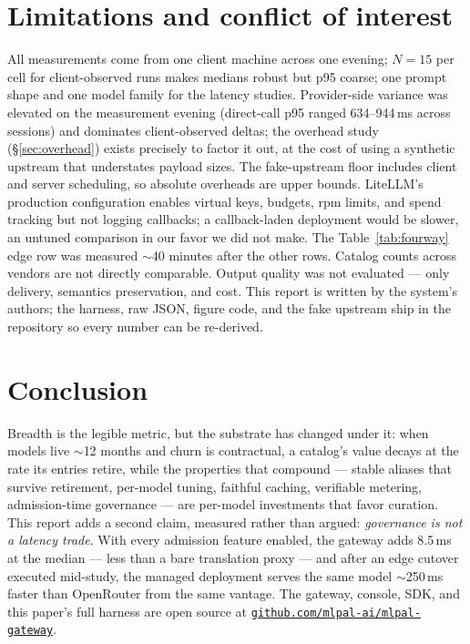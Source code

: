 \documentclass[10pt]{article}
\begin{document}
\section{Limitations and conflict of interest}\label{sec:limits}
All measurements come from one client machine across one evening; $N{=}15$ per cell for client-observed runs makes medians robust but p95 coarse; one prompt shape and one model family for the latency studies. Provider-side variance was elevated on the measurement evening (direct-call p95 ranged 634--944\,ms across sessions) and dominates client-observed deltas; the overhead study (\S\ref{sec:overhead}) exists precisely to factor it out, at the cost of using a synthetic upstream that understates payload sizes. The fake-upstream floor includes client and server scheduling, so absolute overheads are upper bounds. LiteLLM's production configuration enables virtual keys, budgets, rpm limits, and spend tracking but not logging callbacks; a callback-laden deployment would be slower, an untuned comparison in our favor we did not make. The Table~\ref{tab:fourway} edge row was measured $\sim$40 minutes after the other rows. Catalog counts across vendors are not directly comparable. Output quality was not evaluated --- only delivery, semantics preservation, and cost. This report is written by the system's authors; the harness, raw JSON, figure code, and the fake upstream ship in the repository so every number can be re-derived.

\section{Conclusion}
Breadth is the legible metric, but the substrate has changed under it: when models live $\sim$12 months and churn is contractual, a catalog's value decays at the rate its entries retire, while the properties that compound --- stable aliases that survive retirement, per-model tuning, faithful caching, verifiable metering, admission-time governance --- are per-model investments that favor curation. This report adds a second claim, measured rather than argued: \emph{governance is not a latency trade}. With every admission feature enabled, the gateway adds 8.5\,ms at the median --- less than a bare translation proxy --- and after an edge cutover executed mid-study, the managed deployment serves the same model $\sim$250\,ms faster than OpenRouter from the same vantage. The gateway, console, SDK, and this paper's full harness are open source at \href{https://github.com/mlpal-ai/mlpal-gateway}{\texttt{github.com/mlpal-ai/mlpal-gateway}}.
\end{document}
